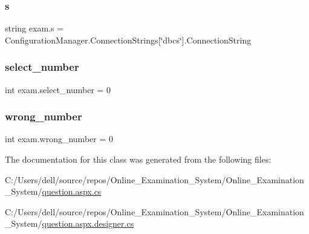 \subsubsection{\texorpdfstring{s}{s}}
{\footnotesize\ttfamily string exam.\+s = Configuration\+Manager.\+Connection\+Strings\mbox{[}\char`\"{}dbcs\char`\"{}\mbox{]}.Connection\+String\hspace{0.3cm}{\ttfamily [private]}}

\mbox{\label{classexam_ab4df7c7aa857cb162d3b383e900c017c}} 
\subsubsection{\texorpdfstring{select\_number}{select\_number}}
{\footnotesize\ttfamily int exam.\+select\+\_\+number = 0\hspace{0.3cm}{\ttfamily [private]}}

\mbox{\label{classexam_a2b91d7f5691387ef7244aaff89984a37}} 
\subsubsection{\texorpdfstring{wrong\_number}{wrong\_number}}
{\footnotesize\ttfamily int exam.\+wrong\+\_\+number = 0\hspace{0.3cm}{\ttfamily [private]}}



The documentation for this class was generated from the following files\+:\begin{DoxyCompactItemize}
\item 
C\+:/\+Users/dell/source/repos/\+Online\+\_\+\+Examination\+\_\+\+System/\+Online\+\_\+\+Examination\+\_\+\+System/\mbox{\hyperlink{question_8aspx_8cs}{question.\+aspx.\+cs}}\item 
C\+:/\+Users/dell/source/repos/\+Online\+\_\+\+Examination\+\_\+\+System/\+Online\+\_\+\+Examination\+\_\+\+System/\mbox{\hyperlink{question_8aspx_8designer_8cs}{question.\+aspx.\+designer.\+cs}}\end{DoxyCompactItemize}

